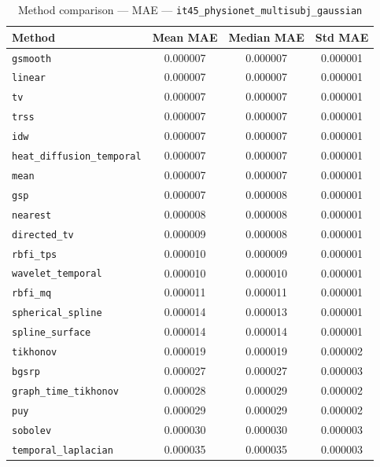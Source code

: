 \begin{table}[ht]
\centering
\caption{Method comparison — MAE — \texttt{it45_physionet_multisubj_gaussian}}
\label{tab:mae_it45_physionet_multisubj_gaussian}
\begin{tabular}{lccc}
\hline
Method & Mean MAE & Median MAE & Std MAE \\
\hline
\texttt{gsmooth} & 0.000007 & 0.000007 & 0.000001 \\
\texttt{linear} & 0.000007 & 0.000007 & 0.000001 \\
\texttt{tv} & 0.000007 & 0.000007 & 0.000001 \\
\texttt{trss} & 0.000007 & 0.000007 & 0.000001 \\
\texttt{idw} & 0.000007 & 0.000007 & 0.000001 \\
\texttt{heat_diffusion_temporal} & 0.000007 & 0.000007 & 0.000001 \\
\texttt{mean} & 0.000007 & 0.000007 & 0.000001 \\
\texttt{gsp} & 0.000007 & 0.000008 & 0.000001 \\
\texttt{nearest} & 0.000008 & 0.000008 & 0.000001 \\
\texttt{directed_tv} & 0.000009 & 0.000008 & 0.000001 \\
\texttt{rbfi_tps} & 0.000010 & 0.000009 & 0.000001 \\
\texttt{wavelet_temporal} & 0.000010 & 0.000010 & 0.000001 \\
\texttt{rbfi_mq} & 0.000011 & 0.000011 & 0.000001 \\
\texttt{spherical_spline} & 0.000014 & 0.000013 & 0.000001 \\
\texttt{spline_surface} & 0.000014 & 0.000014 & 0.000001 \\
\texttt{tikhonov} & 0.000019 & 0.000019 & 0.000002 \\
\texttt{bgsrp} & 0.000027 & 0.000027 & 0.000003 \\
\texttt{graph_time_tikhonov} & 0.000028 & 0.000029 & 0.000002 \\
\texttt{puy} & 0.000029 & 0.000029 & 0.000002 \\
\texttt{sobolev} & 0.000030 & 0.000030 & 0.000003 \\
\texttt{temporal_laplacian} & 0.000035 & 0.000035 & 0.000003 \\
\hline
\end{tabular}
\end{table}
